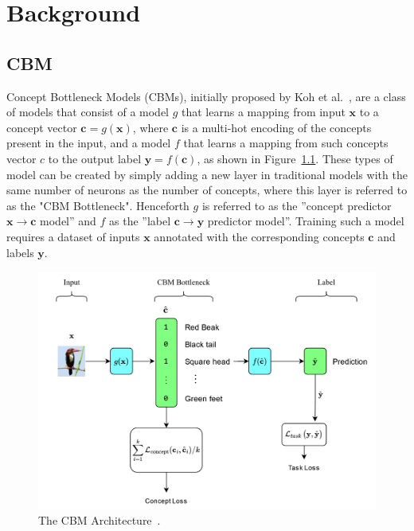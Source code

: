 \documentclass[../main.tex]{subfiles}
\begin{document}
\chapter{Background}

\section{CBM}\label{background:cbm}

Concept Bottleneck Models (CBMs), initially proposed by Koh et al.~\cite{cbm}, are a class of models
that consist of a model $g$ that learns a mapping from
input $\mathbf{x}$ to a concept vector $\mathbf{c} = g(\mathbf{x})$, 
where $\mathbf{c}$ is a multi-hot encoding of the concepts present in the input,
and a model $f$
that learns a mapping from such concepts vector $c$
to the output label $\mathbf{y} = f(\mathbf{c})$, as shown in Figure~\ref{fig:cbm}.
These types of model can be created by simply adding a new layer in traditional models
with the same number of neurons as the number of concepts, where this layer
is referred to as the "CBM Bottleneck". 
Henceforth $g$ is referred to as the ''concept predictor $\mathbf{x} \to \mathbf{c}$ model'' and $f$ as the
''label $\mathbf{c} \to \mathbf{y}$ predictor model''.
 Training such a model requires a
dataset of inputs $\mathbf{x}$ annotated with the corresponding 
concepts $\mathbf{c}$ and labels $\mathbf{y}$. 

\begin{figure}[!h]
    \centering
    \includegraphics[width=\textwidth]{figs/background/cbm.png}
    \caption{The CBM Architecture~\cite{cbm}.}
    \label{fig:cbm}
\end{figure}
\end{document}

